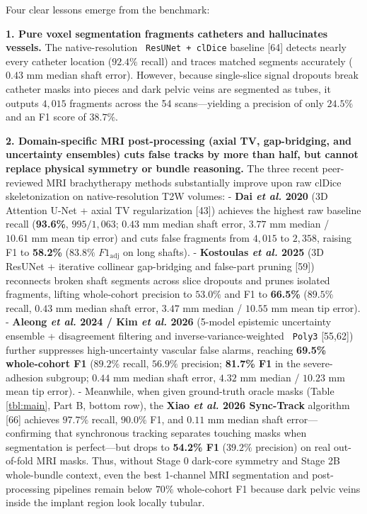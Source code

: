 \documentclass[
  11pt,
]{article}
\let\nforigtexttt\texttt
\renewcommand{\texttt}[1]{\nforigtexttt{\XeTeXinterchartokenstate=1 #1}}
\begin{document}
Four clear lessons emerge from the benchmark:

\textbf{1. Pure voxel segmentation fragments catheters and hallucinates
vessels.} The native-resolution \texttt{ResUNet\ +\ clDice} baseline
{[}64{]} detects nearly every catheter location (\(92.4\%\) recall) and
traces matched segments accurately (\(0.43\text{ mm}\) median shaft
error). However, because single-slice signal dropouts break catheter
masks into pieces and dark pelvic veins are segmented as tubes, it
outputs \(4,015\) fragments across the 54 scans---yielding a precision
of only \(24.5\%\) and an F1 score of \(38.7\%\).

\textbf{2. Domain-specific MRI post-processing (axial TV, gap-bridging,
and uncertainty ensembles) cuts false tracks by more than half, but
cannot replace physical symmetry or bundle reasoning.} The three recent
peer-reviewed MRI brachytherapy methods substantially improve upon raw
clDice skeletonization on native-resolution T2W volumes: - \textbf{Dai
\emph{et al.} 2020} (3D Attention U-Net + axial TV regularization
{[}43{]}) achieves the highest raw baseline recall (\textbf{93.6\%},
\(995/1,063\); \(0.43\text{ mm}\) median shaft error, \(3.77\text{ mm}\)
median / \(10.61\text{ mm}\) mean tip error) and cuts false fragments
from \(4,015\) to \(2,358\), raising F1 to \textbf{58.2\%} (\(83.8\%\)
\(F1_{\text{adj}}\) on long shafts). - \textbf{Kostoulas \emph{et al.}
2025} (3D ResUNet + iterative collinear gap-bridging and false-part
pruning {[}59{]}) reconnects broken shaft segments across slice dropouts
and prunes isolated fragments, lifting whole-cohort precision to
\(53.0\%\) and F1 to \textbf{66.5\%} (\(89.5\%\) recall,
\(0.43\text{ mm}\) median shaft error, \(3.47\text{ mm}\) median /
\(10.55\text{ mm}\) mean tip error). - \textbf{Aleong \emph{et al.} 2024
/ Kim \emph{et al.} 2026} (5-model epistemic uncertainty ensemble +
disagreement filtering and inverse-variance-weighted \texttt{Poly3}
{[}55,62{]}) further suppresses high-uncertainty vascular false alarms,
reaching \textbf{69.5\% whole-cohort F1} (\(89.2\%\) recall, \(56.9\%\)
precision; \textbf{81.7\% F1} in the severe-adhesion subgroup;
\(0.44\text{ mm}\) median shaft error, \(4.32\text{ mm}\) median /
\(10.23\text{ mm}\) mean tip error). - Meanwhile, when given
ground-truth oracle masks (Table \ref{tbl:main}, Part B, bottom row),
the \textbf{Xiao \emph{et al.} 2026 Sync-Track} algorithm {[}66{]}
achieves \(97.7\%\) recall, \(90.0\%\) F1, and \(0.11\text{ mm}\) median
shaft error---confirming that synchronous tracking separates touching
masks when segmentation is perfect---but drops to \textbf{54.2\% F1}
(\(39.2\%\) precision) on real out-of-fold MRI masks. Thus, without
Stage 0 dark-core symmetry and Stage 2B whole-bundle context, even the
best 1-channel MRI segmentation and post-processing pipelines remain
below \(70\%\) whole-cohort F1 because dark pelvic veins inside the
implant region look locally tubular.
\end{document}
